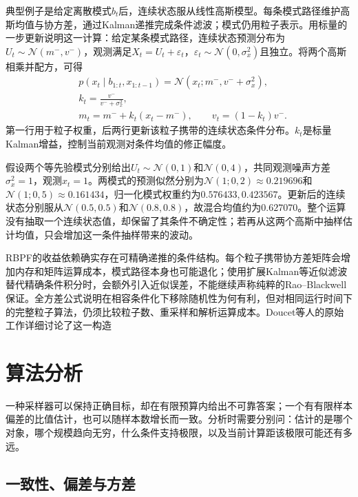 典型例子是给定离散模式$b_t$后，连续状态服从线性高斯模型。每条模式路径维护高斯均值与协方差，通过Kalman递推完成条件滤波；模式仍用粒子表示。用标量的一步更新说明这一计算：给定某条模式路径，连续状态预测分布为$U_t\sim\mathcal{N}(m^-,v^-)$，观测满足$X_t=U_t+\varepsilon_t$，$\varepsilon_t\sim\mathcal{N}(0,\sigma_x^2)$且独立。将两个高斯相乘并配方，可得
\begin{equation}
  \begin{aligned}
    &p(x_t\mid b_{1:t},x_{1:t-1})
       =\mathcal{N}(x_t;m^-,v^-+\sigma_x^2),\\
    &k_t=\frac{v^-}{v^-+\sigma_x^2},\\
    &m_t=m^-+k_t(x_t-m^-),\qquad v_t=(1-k_t)v^-.
  \end{aligned}
  \label{eq:pgm-sampling-rbpf-gaussian}
\end{equation}
第一行用于粒子权重，后两行更新该粒子携带的连续状态条件分布。$k_t$是标量Kalman增益，控制当前观测对条件均值的修正幅度。

假设两个等先验模式分别给出$U_t\sim\mathcal{N}(0,1)$和$\mathcal{N}(0,4)$，共同观测噪声方差$\sigma_x^2=1$，观测$x_t=1$。两模式的预测似然分别为$\mathcal{N}(1;0,2)\approx0.219696$和$\mathcal{N}(1;0,5)\approx0.161434$，归一化模式权重约为$0.576433,0.423567$。更新后的连续状态分别服从$\mathcal{N}(0.5,0.5)$和$\mathcal{N}(0.8,0.8)$，故混合均值约为$0.627070$。整个运算没有抽取一个连续状态值，却保留了其条件不确定性；若再从这两个高斯中抽样估计均值，只会增加这一条件抽样带来的波动。

RBPF的收益依赖确实存在可精确递推的条件结构。每个粒子携带协方差矩阵会增加内存和矩阵运算成本，模式路径本身也可能退化；使用扩展Kalman等近似滤波替代精确条件积分时，会额外引入近似误差，不能继续声称纯粹的Rao--Blackwell保证。全方差公式说明在相容条件化下移除随机性为何有利，但对相同运行时间下的完整粒子算法，仍须比较粒子数、重采样和解析运算成本。Doucet等人的原始工作详细讨论了这一构造

\section{算法分析}
\label{sec:pgm-sampling-analysis}

一种采样器可以保持正确目标，却在有限预算内给出不可靠答案；一个有有限样本偏差的比值估计，也可以随样本数增长而一致。分析时需要分别问：估计的是哪个对象，哪个规模趋向无穷，什么条件支持极限，以及当前计算距该极限可能还有多远。

\subsection{一致性、偏差与方差}
\label{sec:pgm-sampling-consistency}

